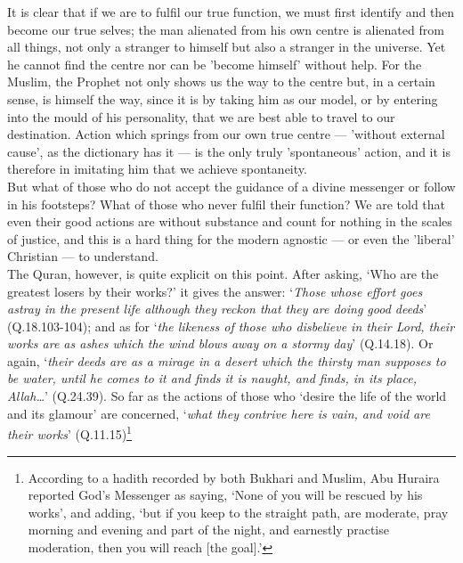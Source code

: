 \documentclass[10pt, twoside,openright]{book}
\begin{document}
It is clear that if we are to fulfil our true function, we must first identify and then become our 
true selves; the man alienated from his own centre is alienated from all things, not only a stranger 
to himself but also a stranger in the universe. Yet he cannot find the centre nor can be 'become 
himself' without help. For the Muslim, the Prophet not only shows us the way to the centre but, in a 
certain sense, is himself the way, since it is by taking him as our model, or by entering into the 
mould of his personality, that we are best able to travel to our destination. Action which springs 
from our own true centre --- 'without external cause', as the dictionary has it --- is the only truly 
'spontaneous' action, and it is therefore in imitating him that we achieve spontaneity. \\

But what of those who do not accept the guidance of a divine messenger or follow in his footsteps? 
What of those who never fulfil their function? We are told that even their good actions are without 
substance and count for nothing in the scales of justice, and this is a hard thing for the modern 
agnostic --- or even the 'liberal' Christian --- to understand. \\

The Quran, however, is quite explicit on this point. After asking, `Who are the greatest losers by 
their works?' it gives the answer: `\emph{Those whose effort goes astray in the present life although they 
reckon that they are doing good deeds}' (Q.18.103-104); and as for `\emph{the likeness of those who 
disbelieve in their Lord, their works are as ashes which the wind blows away on a stormy day}' 
(Q.14.18). Or again, `\emph{their deeds are as a mirage in a desert which the thirsty man supposes to be 
water, until he comes to it and finds it is naught, and finds, in its place, Allah\ldots{}}' (Q.24.39). So 
far as the actions of those who `desire the life of the world and its glamour' are concerned, `\emph{what 
they contrive here is vain, and void are their works}' (Q.11.15)\footnote{According to a hadith recorded by both Bukhari and Muslim, Abu Huraira reported God's Messenger as 
saying, `None of you will be rescued by his works', and adding, `but if you keep to the straight 
path, are moderate, pray morning and evening and part of the night, and earnestly practise 
moderation, then you will reach [the goal].'} \\
\end{document}
